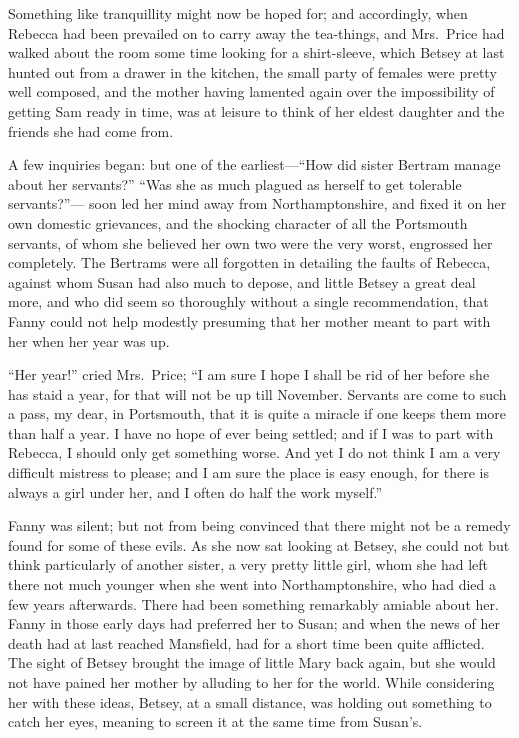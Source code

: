 \documentclass{article}
\begin{document}
Something like tranquillity might now be hoped for;
and accordingly, when Rebecca had been prevailed on
to carry away the tea-things, and Mrs.\ Price had walked
about the room some time looking for a shirt-sleeve, which
Betsey at last hunted out from a drawer in the kitchen,
the small party of females were pretty well composed,
and the mother having lamented again over the impossibility
of getting Sam ready in time, was at leisure to think
of her eldest daughter and the friends she had come from.

A few inquiries began:  but one of the earliest---``How did
sister Bertram manage about her servants?''  ``Was she
as much plagued as herself to get tolerable servants?''---%
soon led her mind away from Northamptonshire, and fixed it
on her own domestic grievances, and the shocking character
of all the Portsmouth servants, of whom she believed her
own two were the very worst, engrossed her completely.
The Bertrams were all forgotten in detailing the faults
of Rebecca, against whom Susan had also much to depose,
and little Betsey a great deal more, and who did seem
so thoroughly without a single recommendation, that Fanny
could not help modestly presuming that her mother meant
to part with her when her year was up.

``Her year!'' cried Mrs.\ Price; ``I am sure I hope I
shall be rid of her before she has staid a year,
for that will not be up till November.  Servants are come
to such a pass, my dear, in Portsmouth, that it is quite
a miracle if one keeps them more than half a year.
I have no hope of ever being settled; and if I was to
part with Rebecca, I should only get something worse.
And yet I do not think I am a very difficult mistress
to please; and I am sure the place is easy enough,
for there is always a girl under her, and I often do half
the work myself.''

Fanny was silent; but not from being convinced that there
might not be a remedy found for some of these evils.
As she now sat looking at Betsey, she could not but think
particularly of another sister, a very pretty little girl,
whom she had left there not much younger when she went
into Northamptonshire, who had died a few years afterwards.
There had been something remarkably amiable about her.
Fanny in those early days had preferred her to Susan;
and when the news of her death had at last reached Mansfield,
had for a short time been quite afflicted.  The sight
of Betsey brought the image of little Mary back again,
but she would not have pained her mother by alluding to her
for the world.  While considering her with these ideas,
Betsey, at a small distance, was holding out something to
catch her eyes, meaning to screen it at the same time from
Susan's.
\end{document}
